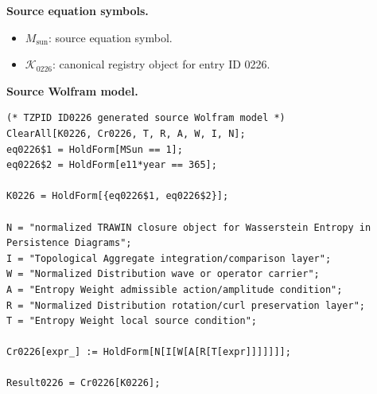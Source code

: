 \begin{minipage}[t]{0.49\linewidth}
\begingroup
\small
\raggedright
\textbf{Source equation symbols.}\par
\begin{itemize}[leftmargin=1.35em,itemsep=1pt,topsep=1pt,parsep=0pt]
    \item $M_{\mathrm{sun}}$: source equation symbol.
    \item $\mathcal{K}_{0226}$: canonical registry object for entry ID 0226.
\end{itemize}
\endgroup
\end{minipage}\hfill
\begin{minipage}[t]{0.47\linewidth}
\begingroup
\scriptsize
\raggedright
\textbf{Source Wolfram model.}\par
\begin{Verbatim}[fontsize=\tiny,breaklines=true,breakanywhere=true]
(* TZPID ID0226 generated source Wolfram model *)
ClearAll[K0226, Cr0226, T, R, A, W, I, N];
eq0226$1 = HoldForm[MSun == 1];
eq0226$2 = HoldForm[e11*year == 365];

K0226 = HoldForm[{eq0226$1, eq0226$2}];

N = "normalized TRAWIN closure object for Wasserstein Entropy in Persistence Diagrams";
I = "Topological Aggregate integration/comparison layer";
W = "Normalized Distribution wave or operator carrier";
A = "Entropy Weight admissible action/amplitude condition";
R = "Normalized Distribution rotation/curl preservation layer";
T = "Entropy Weight local source condition";

Cr0226[expr_] := HoldForm[N[I[W[A[R[T[expr]]]]]]];

Result0226 = Cr0226[K0226];
\end{Verbatim}
\endgroup
\end{minipage}


